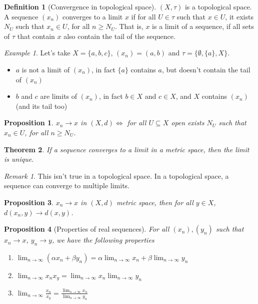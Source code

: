 \documentclass{article}
\newcommand{\DS}{\displaystyle}
\newenvironment{enumrom}{\begin{enumerate}[label=(\roman*)]}{\end{enumerate}}
\newcommand{\fr}[2]{\frac{#1}{#2}}
\newcommand{\limn}{\lim_{n \to \infty}}
\theoremstyle{definition}
\newtheorem{definition}{Definition}[section]
\theoremstyle{definition}
\theoremstyle{plain}
\newtheorem{theorem}{Theorem}[section]
\theoremstyle{plain}
\theoremstyle{plain}
\theoremstyle{plain}
\newtheorem{proposition}[theorem]{Proposition}
\theoremstyle{definition}
\theoremstyle{remark}
\newtheorem{exampled}{Example}[definition]
\theoremstyle{remark}
\theoremstyle{remark}
\theoremstyle{remark}
\newtheorem*{remark}{Remark}
\begin{document}
\begin{definition}[Convergence in topological space]
  $(X, \tau)$ is a topological space. A sequence $(x_n)$ converges to a limit $x$ if for all $U \in \tau$ such that $x \in U$, it exists $N_U$ such that $x_n \in U$, for all $n \geq N_U$. That is, $x$ is a limit of a sequence, if all sets of $\tau$ that contain $x$ also contain the tail of the sequence.
\end{definition}

\begin{exampled}
  Let's take $X = \{ a, b, c \}$, $(x_n) = (a, b)$ and $\tau = \{ \emptyset, \{ a \}, X \}$.
  \begin{itemize}
  \item $a$ is not a limit of $(x_n)$, in fact $\{ a \}$ contains $a$, but doesn't contain the tail of $(x_n)$
  \item $b$ and $c$ are limits of $(x_n)$, in fact $b \in X$ and $c \in X$, and $X$ contains $(x_n)$ (and its tail too)
  \end{itemize}
\end{exampled}


\begin{proposition}
  $x_n \to x$ in $(X, d) \iff$ for all $U \subseteq X$ open exists $N_U$ such that $x_n \in U$, for all $n \geq N_U$.
\end{proposition}



\begin{theorem}
  If a sequence converges to a limit in a metric space, then the limit is unique.
\end{theorem}


\begin{remark}
  This isn't true in a topological space. In a topological space, a sequence can converge to multiple limits.
\end{remark}


\begin{proposition}
  $x_n \to x$ in $(X,d)$ metric space, then for all $y \in X$, $d(x_n,y) \to d(x,y)$.
\end{proposition}


\begin{proposition}[Properties of real sequences]
  For all $(x_n), (y_n)$ such that $x_n \to x$, $y_n \to y$, we have the following properties
  \begin{enumrom}
  \item $\DS \limn (\alpha x_n + \beta y_n) = \alpha \limn x_n + \beta \limn y_n$
  \item $\DS \limn x_n x_y = \limn x_n \limn y_n$
  \item $\DS \limn \fr{x_n}{x_y} = \fr{\limn x_n}{\limn y_n}$
  \end{enumrom}
\end{proposition}
\end{document}
